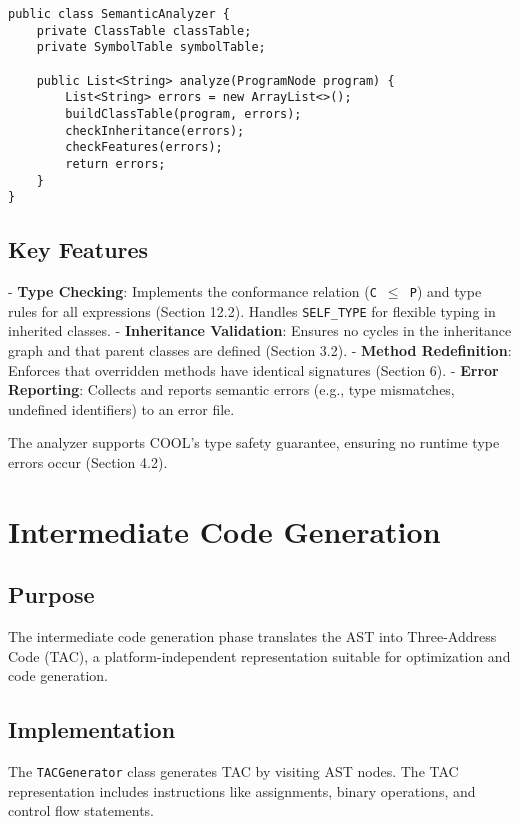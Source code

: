 \documentclass[titlepage]{article}
\begin{document}
\begin{lstlisting}
public class SemanticAnalyzer {
    private ClassTable classTable;
    private SymbolTable symbolTable;

    public List<String> analyze(ProgramNode program) {
        List<String> errors = new ArrayList<>();
        buildClassTable(program, errors);
        checkInheritance(errors);
        checkFeatures(errors);
        return errors;
    }
}
\end{lstlisting}

\subsection{Key Features}

- \textbf{Type Checking}: Implements the conformance relation (\texttt{C $\leq$ P}) and type rules for all expressions (Section 12.2). Handles \texttt{SELF\_TYPE} for flexible typing in inherited classes.
- \textbf{Inheritance Validation}: Ensures no cycles in the inheritance graph and that parent classes are defined (Section 3.2).
- \textbf{Method Redefinition}: Enforces that overridden methods have identical signatures (Section 6).
- \textbf{Error Reporting}: Collects and reports semantic errors (e.g., type mismatches, undefined identifiers) to an error file.

The analyzer supports COOL's type safety guarantee, ensuring no runtime type errors occur (Section 4.2).

\section{Intermediate Code Generation}

\subsection{Purpose}

The intermediate code generation phase translates the AST into Three-Address Code (TAC), a platform-independent representation suitable for optimization and code generation.

\subsection{Implementation}

The \texttt{TACGenerator} class generates TAC by visiting AST nodes. The TAC representation includes instructions like assignments, binary operations, and control flow statements.
\end{document}
